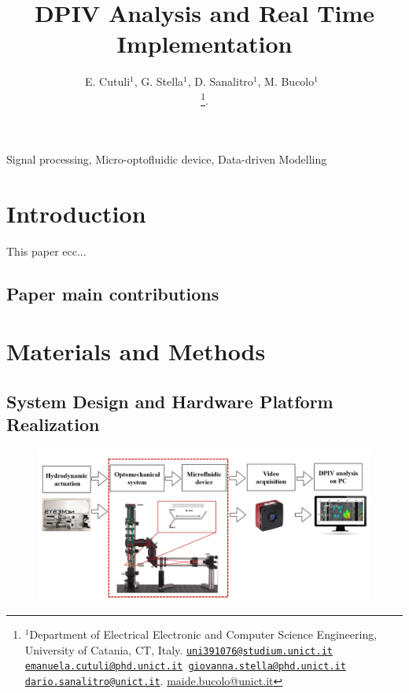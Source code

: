 \documentclass[journal]{IEEEtran}
\title{DPIV Analysis and Real Time Implementation}
\author{E. Cutuli${^{1}}$, G. Stella${^{1}}$, D. Sanalitro${^{1}}$, M. Bucolo${^{1}}$~\IEEEmembership{Senior Member,~IEEE}

\thanks{$^1$Department of Electrical Electronic and Computer Science Engineering, University of Catania, CT, Italy. {\tt \scriptsize\href{mailto:uni391076@studium.unict.it}{\mbox{uni391076@studium.unict.it}}
\scriptsize\href{mailto:emaunuela.cutuli@phd.unict.it}{\mbox{emanuela.cutuli@phd.unict.it}}
\scriptsize\href{mailto:giovanna.stella@phd.unict.it}{\mbox{giovanna.stella@phd.unict.it}}
\scriptsize\href{mailto:dario.sanalitro@unict.it}{\mbox{dario.sanalitro@unict.it}}}. 
\scriptsize\href{mailto:maide.bucolo@unict.it}{\mbox{maide.bucolo@unict.it}}}. 
}
\theoremstyle{definition}
\theoremstyle{remark}
\begin{document}


\maketitle

\begin{abstract}

\end{abstract}

\begin{IEEEkeywords}
	Signal processing, Micro-optofluidic device, Data-driven Modelling
\end{IEEEkeywords}

\section{Introduction}

This paper ecc...

\subsection{Paper main contributions}


\section{Materials and Methods}

\subsection{System Design and Hardware Platform Realization}\label{sec:design}

\begin{figure}[t]
	\centering
	\includegraphics[width=2\columnwidth]{images/PlatformDesign}
\end{figure}
\end{document}
